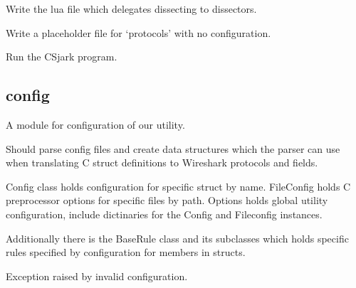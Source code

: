 \documentclass[A4paper,10pt,english]{sphinxmanual}
\begin{document}

\begin{fulllineitems}
\label{devel/code:csjark.write_delegator_to_file}
Write the lua file which delegates dissecting to dissectors.

\end{fulllineitems}


\begin{fulllineitems}
\label{devel/code:csjark.write_placeholders_to_file}
Write a placeholder file for `protocols' with no configuration.

\end{fulllineitems}


\begin{fulllineitems}
\label{devel/code:csjark.main}
Run the CSjark program.

\end{fulllineitems}



\subsection{config}
\label{devel/code:module-config}\label{devel/code:config}
A module for configuration of our utility.

Should parse config files and create data structures which the parser can
use when translating C struct definitions to Wireshark protocols and fields.

Config class holds configuration for specific struct by name. FileConfig
holds C preprocessor options for specific files by path. Options holds
global utility configuration, include dictinaries for the Config and
Fileconfig instances.

Additionally there is the BaseRule class and its subclasses which holds
specific rules specified by configuration for members in structs.

\begin{fulllineitems}
\label{devel/code:config.ConfigError}
Exception raised by invalid configuration.

\end{fulllineitems}
\end{document}
